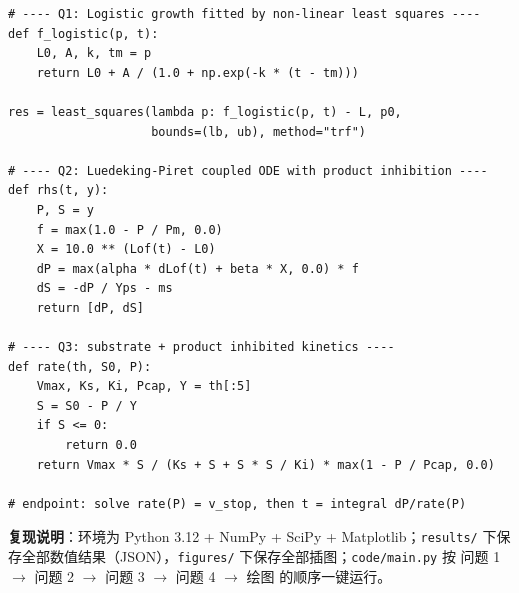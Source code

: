 \begin{verbatim}
# ---- Q1: Logistic growth fitted by non-linear least squares ----
def f_logistic(p, t):
    L0, A, k, tm = p
    return L0 + A / (1.0 + np.exp(-k * (t - tm)))

res = least_squares(lambda p: f_logistic(p, t) - L, p0,
                    bounds=(lb, ub), method="trf")

# ---- Q2: Luedeking-Piret coupled ODE with product inhibition ----
def rhs(t, y):
    P, S = y
    f = max(1.0 - P / Pm, 0.0)
    X = 10.0 ** (Lof(t) - L0)
    dP = max(alpha * dLof(t) + beta * X, 0.0) * f
    dS = -dP / Yps - ms
    return [dP, dS]

# ---- Q3: substrate + product inhibited kinetics ----
def rate(th, S0, P):
    Vmax, Ks, Ki, Pcap, Y = th[:5]
    S = S0 - P / Y
    if S <= 0:
        return 0.0
    return Vmax * S / (Ks + S + S * S / Ki) * max(1 - P / Pcap, 0.0)

# endpoint: solve rate(P) = v_stop, then t = integral dP/rate(P)
\end{verbatim}

\noindent\textbf{复现说明}：环境为 Python 3.12 + NumPy + SciPy + Matplotlib；\texttt{results/} 下保存全部数值结果（JSON），\texttt{figures/} 下保存全部插图；\texttt{code/main.py} 按 问题 1 $\to$ 问题 2 $\to$ 问题 3 $\to$ 问题 4 $\to$ 绘图 的顺序一键运行。


